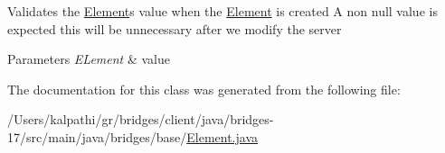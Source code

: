 Validates the \mbox{\hyperlink{classbridges_1_1base_1_1_element}{Element}}\textquotesingle{}s value when the \mbox{\hyperlink{classbridges_1_1base_1_1_element}{Element}} is created A non null value is expected this will be unnecessary after we modify the server 
\begin{DoxyParams}{Parameters}
{\em E\+Lement} & value \\
\hline
\end{DoxyParams}


The documentation for this class was generated from the following file\+:\begin{DoxyCompactItemize}
\item 
/\+Users/kalpathi/gr/bridges/client/java/bridges-\/17/src/main/java/bridges/base/\mbox{\hyperlink{_element_8java}{Element.\+java}}\end{DoxyCompactItemize}
